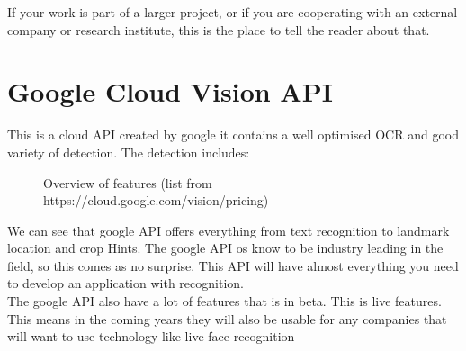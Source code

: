 If your work is part of a larger project, or if you are cooperating with an external company or research institute, this is the place to tell the reader about that.


\section{Google Cloud Vision API}\label{sec:API_Google}


This is a cloud API created by google it contains a well optimised OCR and good variety of detection.
The detection includes:

\begin{figure}[h]
    \caption{Overview of features (list from https://cloud.google.com/vision/pricing)}
    \label{fig:Features}
\end{figure}

We can see that google API offers everything from text recognition to landmark location and crop Hints.
The google API os know to be industry leading in the field, so this comes as no surprise.
This API will have almost everything you need to develop an application with recognition.
\\
The google API also have a lot of features that is in beta.
This is live features.
This means in the coming years they will also be usable for any companies that will want to use technology like live face recognition
\clearpage


